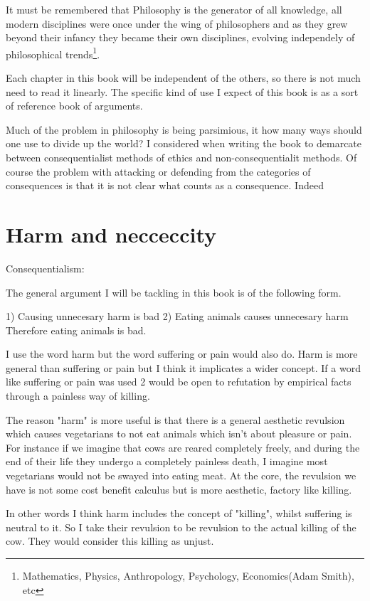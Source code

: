 \documentclass[12pt]{report}
\numberwithin{equation}{section}
\begin{document}
It must be remembered that Philosophy is the generator of all knowledge, all modern disciplines were once under the wing of philosophers and as they grew beyond their infancy they became their own disciplines, evolving independely of philosophical trends\footnote{Mathematics, Physics, Anthropology, Psychology, Economics(Adam Smith), etc}. 

Each chapter in this book will be independent of the others, so there is not much need to read it linearly. The specific kind of use I expect of this book is as a sort of reference book of arguments. 

Much of the problem in philosophy is being parsimious, it how many ways should one use to divide up the world? I considered when writing the book to demarcate between consequentialist methods of ethics and non-consequentialit methods. Of course the problem with attacking or defending from the categories of consequences is that it is not clear what counts as a consequence. Indeed 

\section{Harm and necceccity}

Consequentialism:

The general argument I will be tackling in this book is of the following form.

1) Causing unnecesary harm is bad
2) Eating animals causes unnecesary harm
Therefore eating animals is bad. 

I use the word harm but the word suffering or pain would also do. Harm is more general than suffering or pain but I think it implicates a wider concept. If a word like suffering or pain was used 2 would be open to refutation by empirical facts through a painless way of killing. 

The reason "harm" is more useful is that there is a general aesthetic revulsion which causes vegetarians to not eat animals which isn't about pleasure or pain. For instance if we imagine that cows are reared completely freely, and during the end of their life they undergo a completely painless death, I imagine most vegetarians would not be swayed into eating meat. At the core, the revulsion we have is not some cost benefit calculus but is more aesthetic, factory like killing.  

In other words I think harm includes the concept of "killing", whilst suffering is neutral to it. So I take their revulsion to be revulsion to the actual killing of the cow. They would consider this killing as unjust.  
\end{document}
